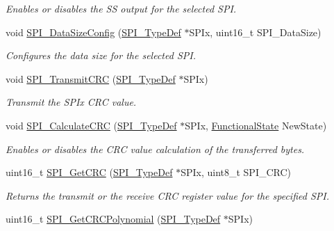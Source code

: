 \begin{DoxyCompactItemize}
\begin{DoxyCompactList}\small\item\em Enables or disables the SS output for the selected S\+PI. \end{DoxyCompactList}\item 
void \mbox{\hyperlink{group___s_p_i___exported___functions_gafc82e90841d7879535d655c035709cb1}{S\+P\+I\+\_\+\+Data\+Size\+Config}} (\mbox{\hyperlink{struct_s_p_i___type_def}{S\+P\+I\+\_\+\+Type\+Def}} $\ast$S\+P\+Ix, uint16\+\_\+t S\+P\+I\+\_\+\+Data\+Size)
\begin{DoxyCompactList}\small\item\em Configures the data size for the selected S\+PI. \end{DoxyCompactList}\item 
void \mbox{\hyperlink{group___s_p_i___exported___functions_gace8b1058e09bab150b0dbe5978810273}{S\+P\+I\+\_\+\+Transmit\+C\+RC}} (\mbox{\hyperlink{struct_s_p_i___type_def}{S\+P\+I\+\_\+\+Type\+Def}} $\ast$S\+P\+Ix)
\begin{DoxyCompactList}\small\item\em Transmit the S\+P\+Ix C\+RC value. \end{DoxyCompactList}\item 
void \mbox{\hyperlink{group___s_p_i___exported___functions_ga64f7276d119e6cb58afc100f8832adb0}{S\+P\+I\+\_\+\+Calculate\+C\+RC}} (\mbox{\hyperlink{struct_s_p_i___type_def}{S\+P\+I\+\_\+\+Type\+Def}} $\ast$S\+P\+Ix, \mbox{\hyperlink{group___exported__types_gac9a7e9a35d2513ec15c3b537aaa4fba1}{Functional\+State}} New\+State)
\begin{DoxyCompactList}\small\item\em Enables or disables the C\+RC value calculation of the transferred bytes. \end{DoxyCompactList}\item 
uint16\+\_\+t \mbox{\hyperlink{group___s_p_i___exported___functions_ga4c81c193516e82cf0a2fdc149ef20cc6}{S\+P\+I\+\_\+\+Get\+C\+RC}} (\mbox{\hyperlink{struct_s_p_i___type_def}{S\+P\+I\+\_\+\+Type\+Def}} $\ast$S\+P\+Ix, uint8\+\_\+t S\+P\+I\+\_\+\+C\+RC)
\begin{DoxyCompactList}\small\item\em Returns the transmit or the receive C\+RC register value for the specified S\+PI. \end{DoxyCompactList}\item 
uint16\+\_\+t \mbox{\hyperlink{group___s_p_i___exported___functions_ga80fb9374cfce670f29128bb78568353f}{S\+P\+I\+\_\+\+Get\+C\+R\+C\+Polynomial}} (\mbox{\hyperlink{struct_s_p_i___type_def}{S\+P\+I\+\_\+\+Type\+Def}} $\ast$S\+P\+Ix)

\end{DoxyCompactItemize}
